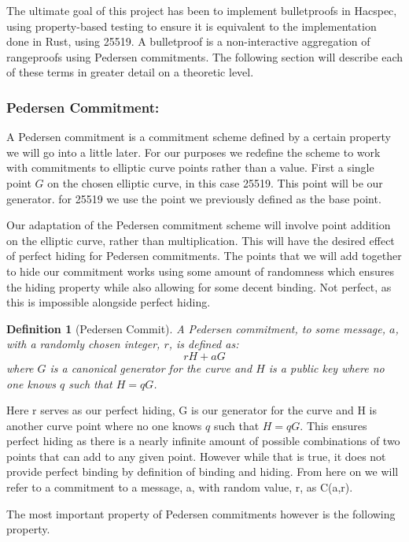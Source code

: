 \documentclass{article}
\newtheorem{definition}{Definition}[section]
\begin{document}
The ultimate goal of this project has been to implement bulletproofs in Hacspec, using property-based testing to ensure it is equivalent to the implementation done in Rust, using 25519. A bulletproof is a non-interactive aggregation of rangeproofs using Pedersen commitments. The following section will describe each of these terms in greater detail on a theoretic level.

\subsubsection{Pedersen Commitment:}

A Pedersen commitment is a commitment scheme defined by a certain property we will go into a little later. For our purposes we redefine the scheme to work with commitments to elliptic curve points rather than a value. First a single point $G$ on the chosen elliptic curve, in this case 25519. This point will be our generator. for 25519 we use the point we previously defined as the base point. 

Our adaptation of the Pedersen commitment scheme will involve point addition on the elliptic curve, rather than multiplication. This will have the desired effect of perfect hiding for Pedersen commitments. The points that we will add together to hide our commitment works using some amount of randomness which ensures the hiding property while also allowing for some decent binding. Not perfect, as this is impossible alongside perfect hiding. 

\begin{definition}[Pedersen Commit]
	A Pedersen commitment, to some message, $a$, with a randomly chosen integer, $r$, is defined as:
	$$rH + aG$$
	where $G$ is a canonical generator for the curve and $H$ is a public key where no one knows $q$ such that $H = qG$.
\end{definition}

Here r serves as our perfect hiding, G is our generator for the curve and H is another curve point where no one knows $q$ such that $H = qG$. This ensures perfect hiding as there is a nearly infinite amount of possible combinations of two points that can add to any given point. However while that is true, it does not provide perfect binding by definition of binding and hiding. From here on we will refer to a commitment to a message, a, with random value, r, as C(a,r).

The most important property of Pedersen commitments however is the following property. 
\end{document}
